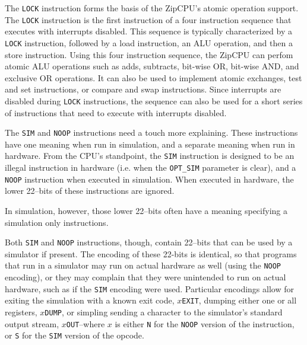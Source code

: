 \documentclass{gqtekspec}
\begin{document}
The {\tt LOCK} instruction forms the basis of the ZipCPU's atomic operation
support.  The {\tt LOCK} instruction is the first instruction of a four
instruction sequence that executes with interrupts disabled.  This sequence is
typically characterized by a {\tt LOCK} instruction, followed by a load
instruction, an ALU operation, and then a store instruction.  Using this four
instruction sequence, the
ZipCPU can perfom atomic ALU operations such as adds, subtracts, bit-wise
OR, bit-wise AND, and exclusive OR operations.  It can also be used to
implement atomic exchanges, test and set instructions, or compare and swap
instructions.  Since interrupts are disabled during {\tt LOCK} instructions,
the sequence can also be used for a short series of instructions that need to
execute with interrupts disabled.

The {\tt SIM} and {\tt NOOP} instructions need a touch more explaining.
These instructions have one meaning when run in simulation, and a separate
meaning when run in hardware.  From the CPU's standpoint, the {\tt SIM}
instruction is designed to be an illegal instruction in hardware (i.e. when the
{\tt OPT\_SIM} parameter is clear), and a {\tt NOOP} instruction when executed
in simulation.  When executed in hardware, the lower 22--bits of these
instructions are ignored.

In simulation, however, those lower 22--bits often have a meaning specifying
a simulation only instructions.

Both {\tt SIM} and {\tt NOOP} instructions, though, contain 22--bits that can
be used by a simulator if present.  The encoding of these 22-bits is identical,
so that programs that run in a simulator may run on actual hardware as well
(using the {\tt NOOP} encoding), or they may complain that they were unintended
to run on actual hardware, such as if the {\tt SIM} encoding were used.
Particular encodings allow for exiting the simulation with a known exit
code, {\tt $x$EXIT}, dumping either one or all registers, {\tt $x$DUMP}, 
or simpling sending a character to the simulator's standard output stream,
{\tt $x$OUT}--where $x$ is either {\tt N} for the {\tt NOOP} version of the
instruction, or {\tt S} for the {\tt SIM} version of the opcode.
\end{document}
